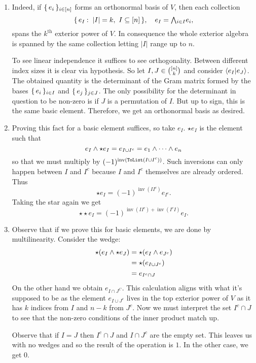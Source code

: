 \documentclass[12pt]{memoir}
\DeclareMathOperator{\inv}{inv}
\begin{document}
\begin{ptcbr}
\begin{enumerate}
    \item Indeed, if $\{\,e_i\,\}_{i\in\left\lbrack n\right\rbrack}$ forms an orthonormal basis of $V$, then each collection 
    $$\set{e_{I}\:\ |I|=k,\ I\subseteq\bonj{n}},\quad e_{ I}=\exterior_{i\in I}e_i,$$
    spans the $k^{\text{th}}$ exterior power of $V$. In consequence the whole exterior algebra is spanned by the same collection letting $|I|$ range up to $n$.\par
    To see linear independence it suffices to see orthogonality. Between different index sizes it is clear via hypothesis. So let $I,J\in\binom{\left\lbrack n\right\rbrack}{k}$ and consider $\braket{e_I}{e_J}$. The obtained quantity is the determinant of the Gram matrix formed by the bases $\{\,e_i\,\}_{i\in I}$ and $\{\,e_j\,\}_{j\in J}$. The only possibility for the determinant in question to be non-zero is if $J$ is a permutation of $I$. But up to sign, this is the same basic element. Therefore, we get an orthonormal basis as desired.
    \item Proving this fact for a basic element suffices, so take $e_I$. $\star e_I$ is the element such that 
    $$e_I\wedge\star e_I=e_{I\cup I^c}=e_1\wedge\cdots\wedge e_n$$
    so that we must multiply by $(-1)^{\inv(\ttt{ToList}(I\cup I^c))}$. Such inversions can only happen between $I$ and $I^c$ because $I$ and $I^c$ themselves are already ordered. Thus 
    $$\star e_I=(-1)^{\inv(II^c)}e_{I^c}.$$
    Taking the star again we get 
    $$\star\star e_I=(-1)^{\inv(II^c)+\inv(I^cI)}e_I.$$
    \item Observe that if we prove this for basic elements, we are done by multilinearity. Consider the wedge:
    \begin{align*}
        \star(e_I\wedge \star e_J)&=\star(e_I\wedge e_{J^c})\\
        &=\star(e_{I\cup J^c})\\
        &=e_{I^c\cap J}
    \end{align*}
    On the other hand we obtain $e_{I\cap J^C}$. This calculation aligns with what it's supposed to be as the element $e_{I\cup J^c}$ lives in the top exterior power of $V$ as it has $k$ indices from $I$ and $n-k$ from $J^c$. Now we must interpret the set $I^c\cap J$ to see that the non-zero conditions of the inner product match up.\par
    Observe that if $I=J$ then $I^c\cap J$ and $I\cap J^c$ are the empty set. This leaves us with no wedges and so the result of the operation is $1$. In the other case, we get 0.
\end{enumerate}
\end{ptcbr}
\end{document}
